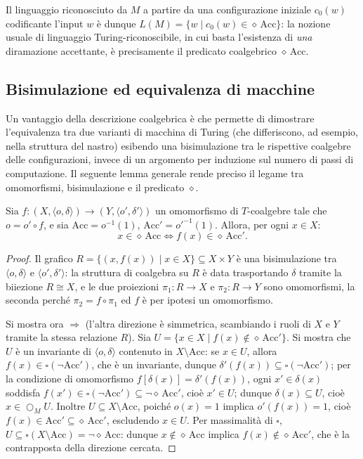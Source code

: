 Il linguaggio riconosciuto da \(M\) a partire da una configurazione iniziale \(c_0(w)\) codificante l'input \(w\) è dunque \(L(M) = \{w \mid c_0(w) \in \diamond\,\mathrm{Acc}\}\): la nozione usuale di linguaggio Turing-riconoscibile, in cui basta l'esistenza di \emph{una} diramazione accettante, è precisamente il predicato coalgebrico \(\diamond\,\mathrm{Acc}\).
 
\subsection{Bisimulazione ed equivalenza di macchine}

Un vantaggio della descrizione coalgebrica è che permette di dimostrare l'equivalenza tra due varianti di macchina di Turing (che differiscono, ad esempio, nella struttura del nastro) esibendo una bisimulazione tra le rispettive coalgebre delle configurazioni, invece di un argomento per induzione sul numero di passi di computazione. Il seguente lemma generale rende preciso il legame tra omomorfismi, bisimulazione e il predicato \(\diamond\).
 
\begin{lemma}
  Sia \(f : (X, \langle o, \delta \rangle) \to (Y, \langle o', \delta' \rangle)\) un omomorfismo di \(T\)-coalgebre tale che \(o = o' \circ f\), e sia \(\mathrm{Acc} = o^{-1}(1)\), \(\mathrm{Acc}' = o'^{-1}(1)\). Allora, per ogni \(x \in X\):
  \[
    x \in \diamond\, \mathrm{Acc} \iff f(x) \in \diamond\, \mathrm{Acc}'.
  \]
\end{lemma}
 
\begin{proof}
  Il grafico \(R = \{(x, f(x)) \mid x \in X\} \subseteq X \times Y\) è una bisimulazione tra \(\langle o, \delta \rangle\) e \(\langle o', \delta' \rangle\): la struttura di coalgebra su \(R\) è data trasportando \(\delta\) tramite la biiezione \(R \cong X\), e le due proiezioni \(\pi_1 : R \to X\) e \(\pi_2 : R \to Y\) sono omomorfismi, la seconda perché \(\pi_2 = f \circ \pi_1\) ed \(f\) è per ipotesi un omomorfismo.
 
  Si mostra ora \(\Rightarrow\) (l'altra direzione è simmetrica, scambiando i ruoli di \(X\) e \(Y\) tramite la stessa relazione \(R\)). Sia \(U = \{x \in X \mid f(x) \notin \diamond\,\mathrm{Acc}'\}\). Si mostra che \(U\) è un invariante di \(\langle o, \delta\rangle\) contenuto in \(X \setminus \mathrm{Acc}\): se \(x \in U\), allora \(f(x) \in \square(\neg\mathrm{Acc}')\), che è un invariante, dunque \(\delta'(f(x)) \subseteq \square(\neg\mathrm{Acc}')\); per la condizione di omomorfismo \(f[\delta(x)] = \delta'(f(x))\), ogni \(x' \in \delta(x)\) soddisfa \(f(x') \in \square(\neg\mathrm{Acc}') \subseteq \neg\diamond\,\mathrm{Acc}'\), cioè \(x' \in U\); dunque \(\delta(x) \subseteq U\), cioè \(x \in \bigcirc_M U\). Inoltre \(U \subseteq X \setminus \mathrm{Acc}\), poiché \(o(x)=1\) implica \(o'(f(x))=1\), cioè \(f(x) \in \mathrm{Acc}' \subseteq \diamond\,\mathrm{Acc}'\), escludendo \(x \in U\). Per massimalità di \(\square\), \(U \subseteq \square(X \setminus \mathrm{Acc}) = \neg \diamond\,\mathrm{Acc}\): dunque \(x \notin \diamond\,\mathrm{Acc}\) implica \(f(x) \notin \diamond\,\mathrm{Acc}'\), che è la contrapposta della direzione cercata.
\end{proof}
 

